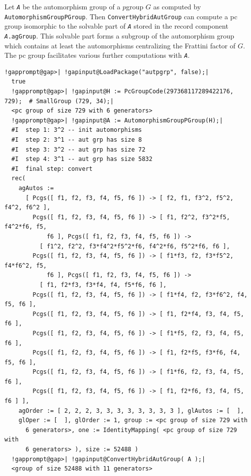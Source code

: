 \documentclass[a4paper,11pt]{report}
\begin{document}
{{{Let \mbox{\texttt{\mdseries\slshape A}} be the automorphism group of a $p$\texttt{}group $G$ as computed by \texttt{AutomorphismGroupPGroup}. Then \texttt{ConvertHybridAutGroup} can compute a pc group isomorphic to the solvable part of \mbox{\texttt{\mdseries\slshape A}} stored in the record component \texttt{\mbox{\texttt{\mdseries\slshape A}}.agGroup}. This solvable part forms a subgroup of the automorphism group which contains
at least the automorphisms centralizing the Frattini factor of $G$. The pc group facilitates various further computations with \mbox{\texttt{\mdseries\slshape A}}. 
\begin{Verbatim}[commandchars=!@|,fontsize=\small,frame=single,label=Example]
  !gapprompt@gap>| !gapinput@LoadPackage("autpgrp", false);|
  true
  !gapprompt@gap>| !gapinput@H := PcGroupCode(297368117289422176, 729);  # SmallGroup (729, 34);|
  <pc group of size 729 with 6 generators>
  !gapprompt@gap>| !gapinput@A := AutomorphismGroupPGroup(H);|
  #I  step 1: 3^2 -- init automorphisms
  #I  step 2: 3^1 -- aut grp has size 8
  #I  step 3: 3^2 -- aut grp has size 72
  #I  step 4: 3^1 -- aut grp has size 5832
  #I  final step: convert
  rec(
    agAutos :=
      [ Pcgs([ f1, f2, f3, f4, f5, f6 ]) -> [ f2, f1, f3^2, f5^2, f4^2, f6^2 ],
        Pcgs([ f1, f2, f3, f4, f5, f6 ]) -> [ f1, f2^2, f3^2*f5, f4^2*f6, f5,
            f6 ], Pcgs([ f1, f2, f3, f4, f5, f6 ]) ->
          [ f1^2, f2^2, f3*f4^2*f5^2*f6, f4^2*f6, f5^2*f6, f6 ],
        Pcgs([ f1, f2, f3, f4, f5, f6 ]) -> [ f1*f3, f2, f3*f5^2, f4*f6^2, f5,
            f6 ], Pcgs([ f1, f2, f3, f4, f5, f6 ]) ->
          [ f1, f2*f3, f3*f4, f4, f5*f6, f6 ],
        Pcgs([ f1, f2, f3, f4, f5, f6 ]) -> [ f1*f4, f2, f3*f6^2, f4, f5, f6 ],
        Pcgs([ f1, f2, f3, f4, f5, f6 ]) -> [ f1, f2*f4, f3, f4, f5, f6 ],
        Pcgs([ f1, f2, f3, f4, f5, f6 ]) -> [ f1*f5, f2, f3, f4, f5, f6 ],
        Pcgs([ f1, f2, f3, f4, f5, f6 ]) -> [ f1, f2*f5, f3*f6, f4, f5, f6 ],
        Pcgs([ f1, f2, f3, f4, f5, f6 ]) -> [ f1*f6, f2, f3, f4, f5, f6 ],
        Pcgs([ f1, f2, f3, f4, f5, f6 ]) -> [ f1, f2*f6, f3, f4, f5, f6 ] ],
    agOrder := [ 2, 2, 2, 3, 3, 3, 3, 3, 3, 3, 3 ], glAutos := [  ],
    glOper := [  ], glOrder := 1, group := <pc group of size 729 with
      6 generators>, one := IdentityMapping( <pc group of size 729 with
      6 generators> ), size := 52488 )
  !gapprompt@gap>| !gapinput@ConvertHybridAutGroup( A );|
  <group of size 52488 with 11 generators>
\end{Verbatim}
}

 

}}
\end{document}
